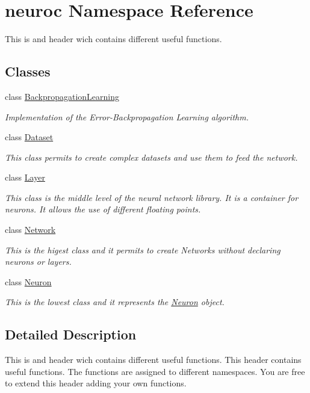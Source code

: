 \hypertarget{namespaceneuroc}{\section{neuroc Namespace Reference}
\label{namespaceneuroc}
}


This is and header wich contains different useful functions.  


\subsection*{Classes}
\begin{DoxyCompactItemize}
\item 
class \hyperlink{classneuroc_1_1_backpropagation_learning}{Backpropagation\-Learning}
\begin{DoxyCompactList}\small\item\em Implementation of the Error-\/\-Backpropagation Learning algorithm. \end{DoxyCompactList}\item 
class \hyperlink{classneuroc_1_1_dataset}{Dataset}
\begin{DoxyCompactList}\small\item\em This class permits to create complex datasets and use them to feed the network. \end{DoxyCompactList}\item 
class \hyperlink{classneuroc_1_1_layer}{Layer}
\begin{DoxyCompactList}\small\item\em This class is the middle level of the neural network library. It is a container for neurons. It allows the use of different floating points. \end{DoxyCompactList}\item 
class \hyperlink{classneuroc_1_1_network}{Network}
\begin{DoxyCompactList}\small\item\em This is the higest class and it permits to create Networks without declaring neurons or layers. \end{DoxyCompactList}\item 
class \hyperlink{classneuroc_1_1_neuron}{Neuron}
\begin{DoxyCompactList}\small\item\em This is the lowest class and it represents the \hyperlink{classneuroc_1_1_neuron}{Neuron} object. \end{DoxyCompactList}\end{DoxyCompactItemize}


\subsection{Detailed Description}
This is and header wich contains different useful functions. This header contains useful functions. The functions are assigned to different namespaces. You are free to extend this header adding your own functions. 